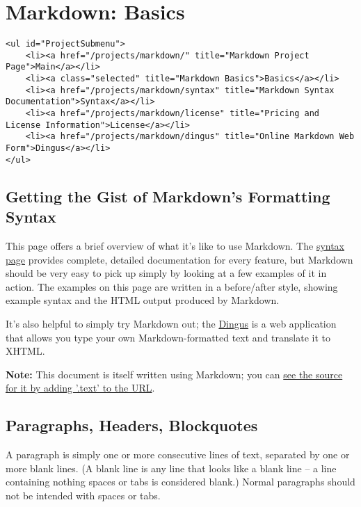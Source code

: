 \section*{Markdown: Basics}


\begin{lstlisting}<ul id="ProjectSubmenu">
    <li><a href="/projects/markdown/" title="Markdown Project Page">Main</a></li>
    <li><a class="selected" title="Markdown Basics">Basics</a></li>
    <li><a href="/projects/markdown/syntax" title="Markdown Syntax Documentation">Syntax</a></li>
    <li><a href="/projects/markdown/license" title="Pricing and License Information">License</a></li>
    <li><a href="/projects/markdown/dingus" title="Online Markdown Web Form">Dingus</a></li>
</ul>\end{lstlisting}


\subsection*{Getting the Gist of Markdown's Formatting Syntax}




This page offers a brief overview of what it's like to use Markdown.
The \href{/projects/markdown/syntax}{syntax page} provides complete, detailed documentation for
every feature, but Markdown should be very easy to pick up simply by
looking at a few examples of it in action. The examples on this page
are written in a before/after style, showing example syntax and the
HTML output produced by Markdown.



It's also helpful to simply try Markdown out; the \href{/projects/markdown/dingus}{Dingus} is a
web application that allows you type your own Markdown-formatted text
and translate it to XHTML.



\textbf{Note:} This document is itself written using Markdown; you
can \href{/projects/markdown/basics.text}{see the source for it by adding '.text' to the URL}.

\subsection*{Paragraphs, Headers, Blockquotes}




A paragraph is simply one or more consecutive lines of text, separated
by one or more blank lines. (A blank line is any line that looks like a
blank line -- a line containing nothing spaces or tabs is considered
blank.) Normal paragraphs should not be intended with spaces or tabs.



